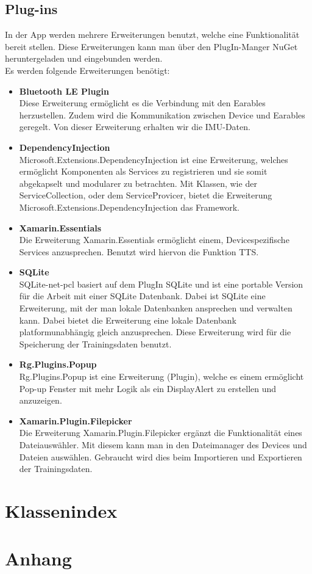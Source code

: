 \documentclass[a4paper,12pt]{article}
\begin{document}
\subsection{Plug-ins}
In der App werden mehrere Erweiterungen benutzt, welche eine Funktionalität bereit stellen. Diese Erweiterungen kann man über den PlugIn-Manger \Gls{NuGet} heruntergeladen und eingebunden werden. \\
Es werden folgende Erweiterungen benötigt:\\
\begin{itemize}
	\item \textbf{\Gls{Bluetooth LE Plugin}}\\Diese Erweiterung ermöglicht es die Verbindung mit den \Gls{Earables} herzustellen. Zudem wird die Kommunikation zwischen Device und \Gls{Earables} geregelt. Von dieser Erweiterung erhalten wir die \Gls{IMU}-Daten.
	\item \textbf{\Gls{DependencyInjection}}\\Microsoft.Extensions.DependencyInjection ist eine Erweiterung, welches ermöglicht Komponenten als Services zu registrieren und sie somit abgekapselt und modularer zu betrachten. Mit Klassen, wie der ServiceCollection, oder dem ServiceProvicer, bietet die Erweiterung Microsoft.Extensions.DependencyInjection das Framework.
	\item \textbf{\Gls{Xamarin.Essentials}}\\Die Erweiterung Xamarin.Essentials ermöglicht einem, Devicespezifische Services anzusprechen. Benutzt wird hiervon die Funktion \Gls{TTS}. 
	\item \textbf{\Gls{SQLite}}\\SQLite-net-pcl basiert auf dem PlugIn SQLite und ist eine portable Version für die Arbeit mit einer SQLite Datenbank. Dabei ist SQLite eine Erweiterung, mit der man lokale Datenbanken ansprechen und verwalten kann. Dabei bietet die Erweiterung eine lokale Datenbank platformunabhängig gleich anzusprechen. Diese Erweiterung wird für die Speicherung der Trainingsdaten benutzt.
	\item \textbf{\Gls{Rg.Plugins.Popup}}\\Rg.Plugins.Popup ist eine Erweiterung (Plugin), welche es einem ermöglicht Pop-up Fenster mit mehr Logik als ein DisplayAlert zu erstellen und anzuzeigen.
	\item \textbf{\Gls{Xamarin.Plugin.Filepicker}}\\Die Erweiterung Xamarin.Plugin.Filepicker ergänzt die Funktionalität eines Dateiauswähler. Mit diesem kann man in den Dateimanager des Devices und Dateien auswählen. Gebraucht wird dies beim Importieren und Exportieren der Trainingsdaten.
\end{itemize}

\section{Klassenindex}
\section{Anhang}

\clearpage

\printglossaries
{}
\end{document}
